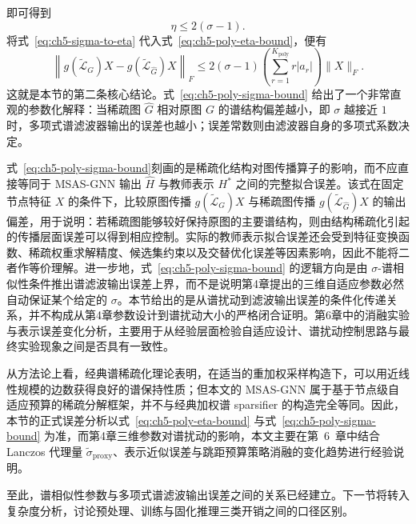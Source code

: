 即可得到
\begin{equation}
  \eta
  \le
  2(\sigma-1).
  \label{eq:ch5-sigma-to-eta}
\end{equation}
将式~\eqref{eq:ch5-sigma-to-eta} 代入式~\eqref{eq:ch5-poly-eta-bound}，便有
\begin{equation}
  \left\|
  g(\tilde{\mathcal{L}}_{G})X-g(\tilde{\mathcal{L}}_{\hat G})X
  \right\|_F
  \le
  2(\sigma-1)
  \left(
  \sum_{r=1}^{K_{\text{poly}}} r|a_r|
  \right)\|X\|_F.
  \label{eq:ch5-poly-sigma-bound}
\end{equation}
这就是本节的第二条核心结论。式~\eqref{eq:ch5-poly-sigma-bound} 给出了一个非常直观的参数化解释：当稀疏图 $\hat G$ 相对原图 $G$ 的谱结构偏差越小，即 $\sigma$ 越接近 $1$ 时，多项式谱滤波器输出的误差也越小；误差常数则由滤波器自身的多项式系数决定。

式~\eqref{eq:ch5-poly-sigma-bound}刻画的是稀疏化结构对图传播算子的影响，而不应直接等同于 MSAS-GNN 输出 $\hat{H}$ 与教师表示 $H^*$ 之间的完整拟合误差。该式在固定节点特征 $X$ 的条件下，比较原图传播 $g(\tilde{\mathcal{L}}_G)X$ 与稀疏图传播 $g(\tilde{\mathcal{L}}_{\hat{G}})X$ 的输出偏差，用于说明：若稀疏图能够较好保持原图的主要谱结构，则由结构稀疏化引起的传播层面误差可以得到相应控制。实际的教师表示拟合误差还会受到特征变换函数、稀疏权重求解精度、候选集约束以及交替优化误差等因素影响，因此不能将二者作等价理解。进一步地，式~\eqref{eq:ch5-poly-sigma-bound} 的逻辑方向是由 $\sigma$-谱相似性条件推出谱滤波输出误差上界，而不是说明第4章提出的三维自适应参数必然自动保证某个给定的 $\sigma$。本节给出的是从谱扰动到滤波输出误差的条件化传递关系，并不构成从第4章参数设计到谱扰动大小的严格闭合证明。第6章中的消融实验与表示误差变化分析，主要用于从经验层面检验自适应设计、谱扰动控制思路与最终实验现象之间是否具有一致性。

从方法论上看，经典谱稀疏化理论表明，在适当的重加权采样构造下，可以用近线性规模的边数获得良好的谱保持性质\cite{Spielman2011EffectiveResistances,Spielman2011SpectralSparsification,Batson2013SpectralSparsificationSurvey}；但本文的 MSAS-GNN 属于基于节点级自适应预算的稀疏分解框架，并不与经典加权谱 sparsifier 的构造完全等同。因此，本节的正式误差分析以式~\eqref{eq:ch5-poly-eta-bound} 与式~\eqref{eq:ch5-poly-sigma-bound} 为准，而第4章三维参数对谱扰动的影响，本文主要在第~6~章中结合 Lanczos 代理量 $\widetilde{\sigma}_{\mathrm{proxy}}$、表示近似误差与跳距预算策略消融的变化趋势进行经验说明。

至此，谱相似性参数与多项式谱滤波输出误差之间的关系已经建立。下一节将转入复杂度分析，讨论预处理、训练与固化推理三类开销之间的口径区别。

